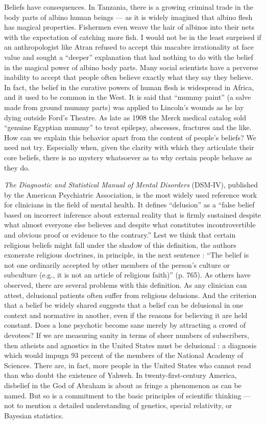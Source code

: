 \documentclass[a4paper,14pt]{extarticle}
\begin{document}
Beliefs have consequences.
In Tanzania, there is a growing criminal trade in the body parts of albino human beings --- as it is widely imagined that albino flesh has magical properties.
Fishermen even weave the hair of albinos into their nets with the expectation of catching more fish.
I would not be in the least surprised if an anthropologist like Atran refused to accept this macabre irrationality at face value and sought a ``deeper'' explanation that had nothing to do with the belief in the magical power of albino body parts.
Many social scientists have a perverse inability to accept that people often believe exactly what they say they believe.
In fact, the belief in the curative powers of human flesh is widespread in Africa, and it used to be common in the West.
It is said that ``mummy paint'' (a salve made from ground mummy parts) was applied to Lincoln’s wounds as he lay dying outside Ford’s Theatre.
As late as 1908 the Merck medical catalog sold ``genuine Egyptian mummy'' to treat epilepsy, abscesses, fractures and the like.
How can we explain this behavior apart from the content of people’s beliefs?
We need not try.
Especially when, given the clarity with which they articulate their core beliefs, there is no mystery whatsoever as to why certain people behave as they do.

\textit{The Diagnostic and Statistical Manual of Mental Disorders} (DSM-IV), published by the American Psychiatric Association, is the most widely used reference work for clinicians in the field of mental health.
It defines ``delusion'' as a ``false belief based on incorrect inference about external reality that is firmly sustained despite what almost everyone else believes and despite what constitutes incontrovertible and obvious proof or evidence to the contrary.''
Lest we think that certain religious beliefs might fall under the shadow of this definition, the authors exonerate religious doctrines, in principle, in the next sentence :
``The belief is not one ordinarily accepted by other members of the person’s culture or subculture (e.g., it is not an article of religious faith)'' (p. 765).
As others have observed, there are several problems with this definition.
As any clinician can attest, delusional patients often suffer from religious delusions.
And the criterion that a belief be widely shared suggests that a belief can be delusional in one context and normative in another, even if the reasons for believing it are held constant.
Does a lone psychotic become sane merely by attracting a crowd of devotees?
If we are measuring sanity in terms of sheer numbers of subscribers, then atheists and agnostics in the United States must be delusional :
a diagnosis which would impugn 93 percent of the members of the National Academy of Sciences.
There are, in fact, more people in the United States who cannot read than who doubt the existence of Yahweh.
In twenty-first-century America, disbelief in the God of Abraham is about as fringe a phenomenon as can be named.
But so is a commitment to the basic principles of scientific thinking --- not to mention a detailed understanding of genetics, special relativity, or Bayesian statistics.
\end{document}
